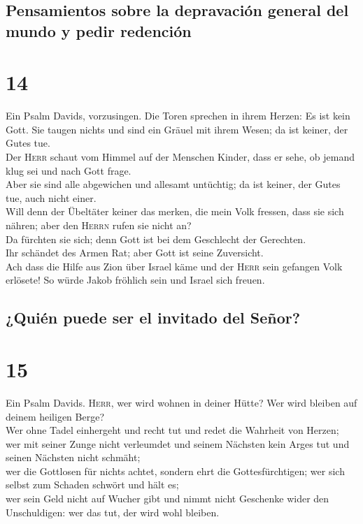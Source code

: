 \hypertarget{pensamientos-sobre-la-depravaciuxf3n-general-del-mundo-y-pedir-redenciuxf3n}{%
\subsection{Pensamientos sobre la depravación general del mundo y pedir
redención}\label{pensamientos-sobre-la-depravaciuxf3n-general-del-mundo-y-pedir-redenciuxf3n}}

\hypertarget{section-13}{%
\section{14}\label{section-13}}

 Ein Psalm Davids, vorzusingen. Die Toren sprechen in
ihrem Herzen: Es ist kein Gott. Sie taugen nichts und sind ein Gräuel
mit ihrem Wesen; da ist keiner, der Gutes tue.\\
 Der \textsc{Herr} schaut vom Himmel auf der Menschen
Kinder, dass er sehe, ob jemand klug sei und nach Gott frage.\\
 Aber sie sind alle abgewichen und allesamt untüchtig; da
ist keiner, der Gutes tue, auch nicht einer.\\
 Will denn der Übeltäter keiner das merken, die mein Volk
fressen, dass sie sich nähren; aber den \textsc{Herrn} rufen sie nicht
an?\\
 Da fürchten sie sich; denn Gott ist bei dem Geschlecht
der Gerechten.\\
 Ihr schändet des Armen Rat; aber Gott ist seine
Zuversicht.\\
 Ach dass die Hilfe aus Zion über Israel käme und der
\textsc{Herr} sein gefangen Volk erlösete! So würde Jakob fröhlich sein
und Israel sich freuen.

\hypertarget{quiuxe9n-puede-ser-el-invitado-del-seuxf1or}{%
\subsection{¿Quién puede ser el invitado del
Señor?}\label{quiuxe9n-puede-ser-el-invitado-del-seuxf1or}}

\hypertarget{section-14}{%
\section{15}\label{section-14}}

 Ein Psalm Davids. \textsc{Herr}, wer wird wohnen in
deiner Hütte? Wer wird bleiben auf deinem heiligen Berge?\\
 Wer ohne Tadel einhergeht und recht tut und redet die
Wahrheit von Herzen;\\
 wer mit seiner Zunge nicht verleumdet und seinem Nächsten
kein Arges tut und seinen Nächsten nicht schmäht;\\
 wer die Gottlosen für nichts achtet, sondern ehrt die
Gottesfürchtigen; wer sich selbst zum Schaden schwört und hält es;\\
 wer sein Geld nicht auf Wucher gibt und nimmt nicht
Geschenke wider den Unschuldigen: wer das tut, der wird wohl bleiben.

